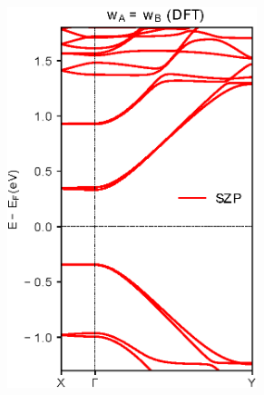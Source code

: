{\begin{figure}[H]
\begin{subfigure}[b]{0.25\textwidth}
		\includegraphics[width=0.8\textwidth]{Figures/MS2OHDFT.eps}
		\vspace{-1\baselineskip}
		\caption{}
		\label{MS2OHDFT}
	\end{subfigure}
	\hspace{-20pt}
	\begin{subfigure}[b]{0.25\textwidth}
		\centering

\end{subfigure}
\end{figure}}
